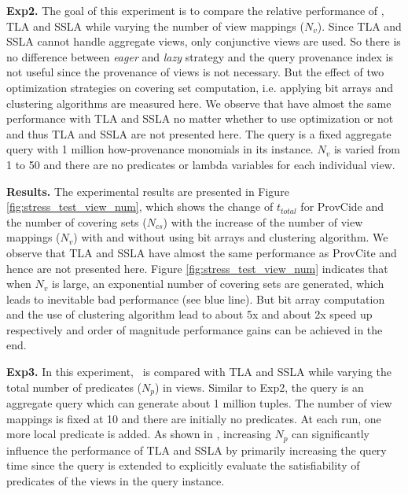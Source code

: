 \textbf{Exp2.} The goal of this experiment is to compare the relative performance of \provalg, TLA and SSLA while varying the number of view mappings ($N_v$). Since TLA and SSLA cannot handle aggregate views, only conjunctive views are used. So there is no difference between {\em eager} and {\em lazy} strategy and the query provenance index is not useful since the provenance of views is not necessary. But the effect of two optimization strategies on covering set computation, i.e. applying bit arrays and clustering algorithms are measured here. We observe that \provalg have almost the same performance with TLA and SSLA no matter whether to use optimization or not and thus TLA and SSLA are not presented here. The query is a fixed aggregate query with 1 million how-provenance monomials in its instance. $N_v$ is varied from 1 to 50 and there are no predicates or lambda variables for each individual view. 

\textbf{Results.}
The experimental results are presented in Figure \ref{fig:stress_test_view_num}, which shows the change of $t_{total}$ for ProvCide and the number of covering sets ($N_{cs}$) with the increase of the number of view mappings ($N_v$) with and without using bit arrays and clustering algorithm. We observe that TLA and SSLA have almost the same performance as ProvCite and hence are not presented here. Figure \ref{fig:stress_test_view_num} indicates that when $N_v$ is large, an exponential number of covering sets are generated, which leads to inevitable bad performance (see blue line). But bit array computation and the use of clustering algorithm lead to about 5x and about 2x speed up respectively and order of magnitude performance gains can be achieved in the end.


\textbf{Exp3.} In this experiment, \provalg\ is compared with TLA and SSLA while varying the total number of predicates ($N_p$) in views. Similar to Exp2, the query is an aggregate query which can generate about 1 million tuples. The number of view mappings is fixed at 10 and there are initially no predicates. At each run, one more local predicate is added. As shown in \cite{wu2018data}, increasing $N_p$ can significantly influence the performance of TLA and SSLA by primarily increasing the query time since the query is extended to explicitly evaluate the satisfiability of predicates of the views in the query instance.

